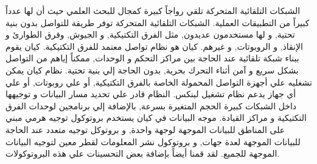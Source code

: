 الشبكات التلقائية المتحركة تلقي رواجاً كبيرة كمجال للبحث العلمي حيث أن لها عدداً كبيراً من التطبيقات العملية. الشبكات التلقائية المتحركة توفر طريقة للتواصل بدون بنية تحتية, و لها مستخدمون عديدون, مثل الفرق التكتيكية, و الجيوش, وفرق الطوارئ و الإنقاذ, و الروبوتات, و غيرهم.
\vspace{\baselineskip}
كيان هو نظام تواصل معتمد للفرق التكتيكية. كيان يقوم ببناء شبكة تلقائية عند الحاجة بين مراكز التحكم و الوحدات, ممكناً إياهم من التواصل بشكل سريع و آمن أثناء التحرك بحرية, بدون الحاجة إلي بنية تحتية.
\vspace{\baselineskip}
نظام كيان يمكن تشغليه علي أجهزة التواصل المحمولة الخاصة بالفرق التكتيكية, أو علي روبوتات, أو علي أي جهاز يدعم نظام تشغيل لينكس. النظام قادر علي تحديد مسار البيانات و توجيهها داخل الشبكات كبيرة الحجم المتغيرة بسرعة, بالإضافة إلي برنامجين لوحدات الفرق التكتيكية و مراكز القيادة.
\vspace{\baselineskip}
موجه البيانات في كيان يستخدم بروتوكول توجيه 
هرمي مبني على المناطق للبيانات الموجهة لوجهة واحدة, و بروتوكل توجيه متعدد عند الحاجة للبيانات الموجهة لعدة جهات, و بروتوكول نشر المعلومات لقطر معين لتوجيه البيانات الموجهة للجميع. لقد قمنا أيضاً بإضافة بعض التحسينات علي هذه البروتوكولات.
